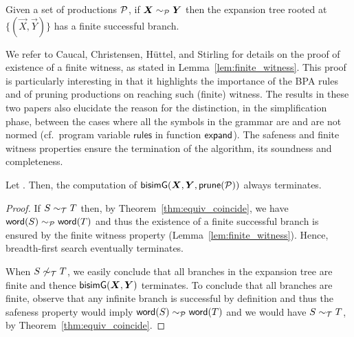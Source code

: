 \begin{lemma} 
\label{lem:finite_witness}
	Given a set of productions $\mathcal P$,
	if $\vec X \ProdEquiv \vec Y$ then the expansion tree rooted at
	$\{(\vec X, \vec Y)\}$ has a finite successful branch.
\end{lemma}

We refer to Caucal, Christensen, H{\"{u}}ttel, and Stirling for
details on the proof of existence of a finite witness, as stated in
Lemma~\ref{lem:finite_witness}. This proof is particularly interesting
in that it highlights the importance of the BPA rules and of pruning
productions on reaching such (finite) witness. The results in these
two papers also elucidate the reason for the distinction, in the
simplification phase, between the cases where all the symbols in the
grammar are and are not normed (cf.~program variable $\mathsf{rules}$
in function $\mathsf{expand}$).
%
The safeness and finite witness properties ensure the termination of
the algorithm, its soundness and completeness.

\begin{lemma}[Termination]
  \label{lem:termination}
  Let \grmcontext. Then, the computation of $\Bisim(\vec X,\vec Y, \Prune(\productions))$
  always terminates.
\end{lemma}
%
\begin{proof}
  If $S\sim_\mathcal T T$ then, by Theorem~\ref{thm:equiv_coincide}, we
  have $\mathsf{word}(S) \sim_\mathcal P \mathsf{word}(T) $ and thus the existence of a
  finite successful branch is ensured by the finite witness property
  (Lemma~\ref{lem:finite_witness}).  Hence, breadth-first search
  eventually terminates.
  
  When $S\not\sim_\mathcal T T$, we easily conclude that all branches in
  the expansion tree are finite and thence $\Bisim(\vec X,\vec Y)$
  terminates.  To conclude that all branches are finite, observe that
  any infinite branch is successful by definition and thus the
  safeness property would imply $\mathsf{word}(S) \sim_\mathcal P \mathsf{word}(T)$ and we would have
  $S\sim_\mathcal T T$, by Theorem~\ref{thm:equiv_coincide}.
\end{proof}


